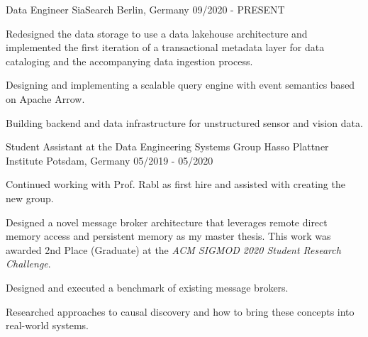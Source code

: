

\begin{cventries}

  \cventry
    {Data Engineer} %
    {SiaSearch} %
    {Berlin, Germany} %
    {09/2020 - PRESENT} %
    {
      \begin{cvitems} %
      \item{Redesigned the data storage to use a data lakehouse architecture and implemented the first iteration of a transactional metadata layer for data cataloging and the accompanying data ingestion process.}
      \item{Designing and implementing a scalable query engine with event semantics based on Apache Arrow.}
      \item{Building backend and data infrastructure for unstructured sensor and vision data.}
      \end{cvitems}
    }

  \cventry
    {Student Assistant at the Data Engineering Systems Group} %
    {Hasso Plattner Institute} %
    {Potsdam, Germany} %
    {05/2019 - 05/2020} %
    {
      \begin{cvitems} %
      \item{Continued working with Prof. Rabl as first hire and assisted with creating the new group.}
      \item{Designed a novel message broker architecture that leverages remote direct memory access and persistent memory as my master thesis. This work was awarded 2nd Place (Graduate) at the \textit{ACM SIGMOD 2020 Student Research Challenge}.}
      \item{Designed and executed a benchmark of existing message brokers.}
      \item{Researched approaches to causal discovery and how to bring these concepts into real-world systems.}
      \end{cvitems}
    }


\end{cventries}
